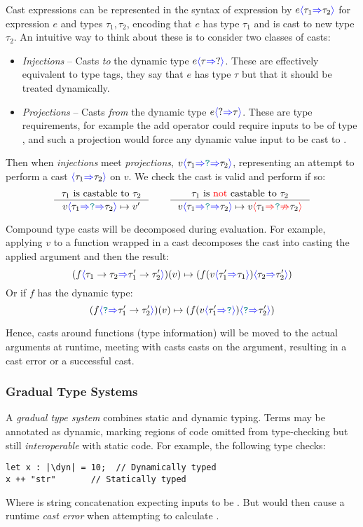 Cast expressions can be represented in the syntax of expression by $e{\color{blue}\langle} \tau_1 {\color{blue}\Rightarrow} \tau_2 {\color{blue}\rangle}$ for expression $e$ and types $\tau_1, \tau_2$, encoding that $e$ has type $\tau_1$ and is cast to new type $\tau_2$. An intuitive way to think about these is to consider two classes of casts:
\begin{itemize}
\item \textit{Injections} -- Casts \textit{to} the dynamic type $e{\color{blue}\langle} \tau {\color{blue}\Rightarrow} ? {\color{blue}\rangle}$. These are effectively equivalent to type tags, they say that $e$ has type $\tau$ but that it should be treated dynamically.
\item \textit{Projections} -- Casts \textit{from} the dynamic type $e{\color{blue}\langle} ? {\color{blue}\Rightarrow} \tau {\color{blue}\rangle}$. These are type requirements, for example the add operator could require inputs to be of type , and such a projection would force any dynamic value input to be cast to . 
\end{itemize}
Then when \textit{injections} meet \textit{projections}, $v{\color{blue}\langle} \tau_1 {\color{blue}\Rightarrow} {\color{teal}\texttt{?}} {\color{blue}\Rightarrow} \tau_2 {\color{blue}\rangle}$, representing an attempt to perform a cast ${\color{blue}\langle} \tau_1 {\color{blue}\Rightarrow} \tau_2 {\color{blue}\rangle}$ on $v$. We check the cast is valid and perform if so:
\[\inference{\tau_1 \text{ is castable to } \tau_2}{v\scastcast{\tau_1}{\dyn}{\tau_2} \mapsto v'} \qquad \inference{\tau_1  \text{ is {\color{red} not }castable to }  \tau_2}{v\scastcast{\tau_1}{\dyn}{\tau_2} \mapsto v\scasterror{\tau_1}{\tau_2}}\]


Compound type casts will be decomposed during evaluation. For example, applying $v$ to a function wrapped in a cast decomposes the cast into casting the applied argument and then the result:
\[(f{\color{blue}\langle} \tau_1 \to \tau_2 {\color{blue}\Rightarrow} \tau_1' \to \tau_2' {\color{blue}\rangle})(v) \mapsto (f(v {\color{blue}\langle} \tau_1' {\color{blue}\Rightarrow} \tau_1 {\color{blue}\rangle}){\color{blue}\langle} \tau_2 {\color{blue}\Rightarrow} \tau_2' {\color{blue}\rangle})\]
Or if $f$ has the dynamic type:
\[(f{\color{blue}\langle} {\color{teal}\texttt{?}} {\color{blue}\Rightarrow} \tau_1' \to \tau_2' {\color{blue}\rangle})(v) \mapsto (f(v {\color{blue}\langle} \tau_1' {\color{blue}\Rightarrow} {\color{teal}\texttt{?}} {\color{blue}\rangle}){\color{blue}\langle} {\color{teal}\texttt{?}} {\color{blue}\Rightarrow} \tau_2' {\color{blue}\rangle})\]

Hence, casts around functions (type information) will be moved to the actual arguments at runtime, meeting with casts casts on the argument, resulting in a cast error or a successful cast.

\subsubsection{Gradual Type Systems}\label{sec:GradualTypeSystem}

A \textit{gradual type system} \cite{GradualRefined, GradualFunctional} combines static and dynamic typing. Terms may be annotated as dynamic, marking regions of code omitted from type-checking but still \textit{interoperable} with static code. For example, the following type checks:
\begin{verbatim}
let x : |\dyn| = 10;  // Dynamically typed
x ++ "str"       // Statically typed
\end{verbatim}
Where \code{++} is string concatenation expecting inputs to be . But would then cause a runtime \textit{cast error} when attempting to calculate .


